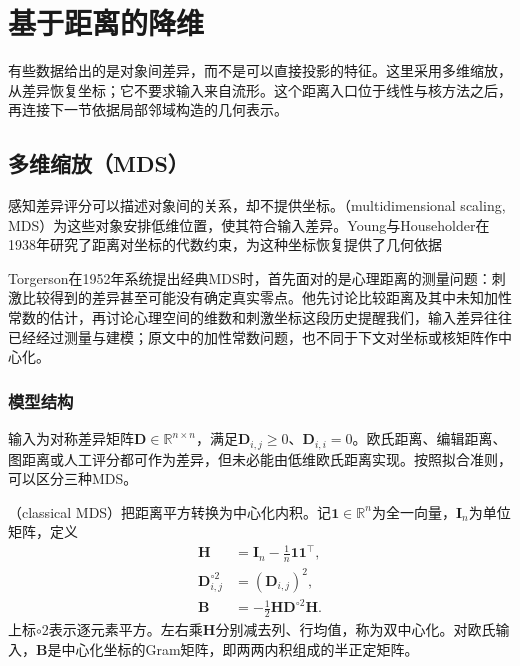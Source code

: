 \section{基于距离的降维}
\label{sec:dim-distance}

有些数据给出的是对象间差异，而不是可以直接投影的特征。这里采用多维缩放，从差异恢复坐标；它不要求输入来自流形。这个距离入口位于线性与核方法之后，再连接下一节依据局部邻域构造的几何表示。

\subsection{多维缩放（MDS）}
\label{sec:dim-mds}

感知差异评分可以描述对象间的关系，却不提供坐标。（multidimensional scaling, MDS）为这些对象安排低维位置，使其符合输入差异。Young与Householder在1938年研究了距离对坐标的代数约束，为这种坐标恢复提供了几何依据

Torgerson在1952年系统提出经典MDS时，首先面对的是心理距离的测量问题：刺激比较得到的差异甚至可能没有确定真实零点。他先讨论比较距离及其中未知加性常数的估计，再讨论心理空间的维数和刺激坐标这段历史提醒我们，输入差异往往已经经过测量与建模；原文中的加性常数问题，也不同于下文对坐标或核矩阵作中心化。

\subsubsection{模型结构}

输入为对称差异矩阵$\bm{D}\in\mathbb{R}^{n\times n}$，满足$\bm{D}_{i,j}\geq0$、$\bm{D}_{i,i}=0$。欧氏距离、编辑距离、图距离或人工评分都可作为差异，但未必能由低维欧氏距离实现。按照拟合准则，可以区分三种MDS。

（classical MDS）把距离平方转换为中心化内积。记$\bm{1}\in\mathbb{R}^n$为全一向量，$\bm{I}_n$为单位矩阵，定义
\begin{equation}
  \label{eq:dim-mds-centering}
  \begin{aligned}
    \bm{H}&=\bm{I}_n-\frac{1}{n}\bm{1}\bm{1}^{\top},\\
    \bm{D}^{\circ2}_{i,j}&=(\bm{D}_{i,j})^2,\\
    \bm{B}&=-\frac12\bm{H}\bm{D}^{\circ2}\bm{H}.
  \end{aligned}
\end{equation}
上标$\circ2$表示逐元素平方。左右乘$\bm{H}$分别减去列、行均值，称为双中心化。对欧氏输入，$\bm{B}$是中心化坐标的Gram矩阵，即两两内积组成的半正定矩阵。

